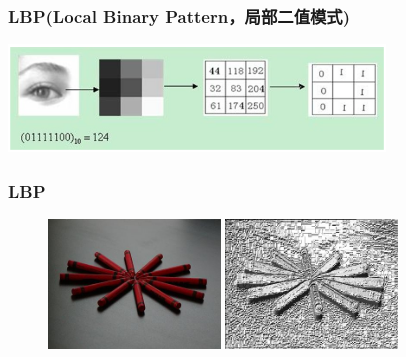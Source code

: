 \documentclass[notheorems,serif,table,compress]{beamer}  %
\begin{document}
%


\begin{frame}
\frametitle{LBP(Local Binary Pattern，局部二值模式)}
\centering\includegraphics[width=10cm]{LBP.png}
\end{frame}


\begin{frame}
\frametitle{LBP}
  \begin{figure}[!ht]
  \begin{minipage}[t]{0.46\textwidth}
  \includegraphics[width=1.8in]{example1.jpg}
  \end{minipage}
  \begin{minipage}[t]{0.46\textwidth}
  \includegraphics[width=1.8in]{LBP1.png}
  \end{minipage}
  \end{figure} 
\end{frame}
\end{document}

